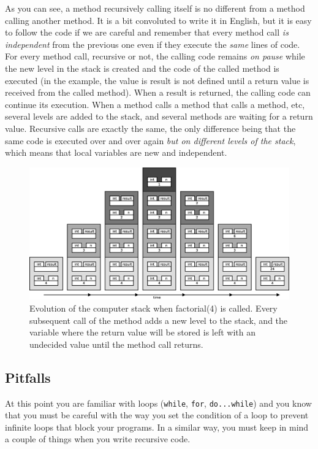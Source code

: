 As you can see, a method recursively calling itself is no different
from a method calling another method. It is a bit convoluted to write
it in English, but it is easy to follow the code if we are careful and
remember that every method call \emph{is independent} from the previous one
even if they execute the \emph{same} lines of code. 
For every method call, recursive
or not, the calling code remains \emph{on pause} while the new level
in the stack is created and the code of the called method is
executed (in the example, the value is result is not defined until a
return value is received from the called method). 
When a result is returned, the calling code can continue its
execution. When a method calls a method that calls a method, etc,
several levels are added to the stack, and several methods are waiting
for a return value. Recursive calls are exactly the same, the only
difference being that the same code is executed over and over again
\emph{but on different levels of the stack}, which means that local
variables are new and independent. 

\begin{figure}[hbtp]
  \centering
  \includegraphics[width=\textwidth]{gfx/recursive-factorial}
  \caption{Evolution of the computer stack when factorial(4) is
    called. Every subsequent call of the method adds a new level to
    the stack, and the variable where the return value will be stored
    is left with an undecided value until the method call returns.}
  \label{fig:fact}
\end{figure}

\subsection{Pitfalls}
\label{sec:pitfalls}

At this point you are familiar with loops (\verb+while+, \verb+for+,
\verb+do...while+) and you know that you must be careful with the
way you set the condition of a loop to prevent infinite loops that
block your programs. In a similar way, you must keep in mind a couple
of things when you write recursive code. 

